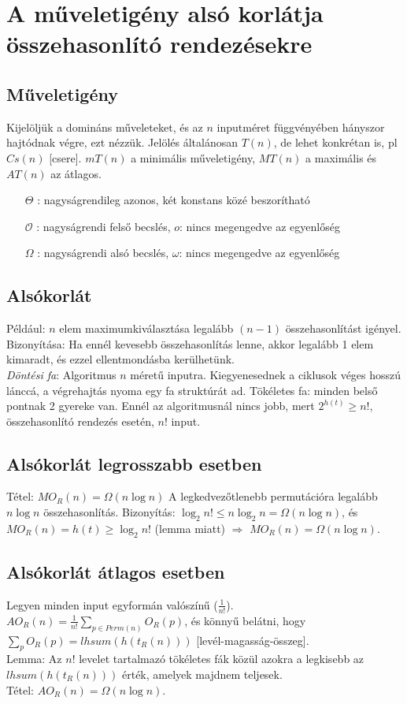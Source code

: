 \documentclass[margin=0px]{article}
\begin{document}
	\section{A műveletigény alsó korlátja összehasonlító rendezésekre}
	
	\subsection{Műveletigény}
	
	Kijelöljük a domináns műveleteket, és az $n$ inputméret függvényében hányszor hajtódnak végre, ezt nézzük. Jelölés általánosan $T(n)$, de lehet konkrétan is, pl $Cs(n)$ [csere]. $mT(n)$ a minimális műveletigény, $MT(n)$ a maximális és $AT(n)$ az átlagos.	
	\begin{itemize}
		\item[$\Theta$]: nagyságrendileg azonos, két konstans közé beszorítható
		\item[$\mathcal{O}$]: nagyságrendi felső becslés, $o$: nincs megengedve az egyenlőség
		\item[$\Omega$]: nagyságrendi alsó becslés, $\omega$: nincs megengedve az egyenlőség
	\end{itemize}
	
	\subsection{Alsókorlát}
	
	Például: $n$ elem maximumkiválasztása legalább $(n-1)$ összehasonlítást igényel. Bizonyítása: Ha ennél kevesebb összehasonlítás lenne, akkor legalább 1 elem kimaradt, és ezzel ellentmondásba kerülhetünk. \\
	\textit{Döntési fa}: Algoritmus $n$ méretű inputra. Kiegyenesednek a ciklusok véges hosszú lánccá, a végrehajtás nyoma egy fa struktúrát ad. Tökéletes fa: minden belső pontnak 2 gyereke van. Ennél az algoritmusnál nincs jobb, mert $2^{h(t)} \geq n!$, összehasonlító rendezés esetén, $n!$ input.
	
	\subsection{Alsókorlát legrosszabb esetben}
	
	Tétel: $MO_R(n) = \Omega(n\log{n})$ A legkedvezőtlenebb permutációra legalább $n\log{n}$ összehasonlítás. Bizonyítás: $\log_2{n!} \leq n\log_2{n} = \Omega(n\log{n})$, és $MO_R(n)=h(t) \geq \log_2{n!}$ (lemma miatt) $\Rightarrow$ $MO_R(n)=\Omega(n\log{n})$.
	
	\subsection{Alsókorlát átlagos esetben}
	
	Legyen minden input egyformán valószínű ($\frac{1}{n!}$). \\
	$AO_R(n) = \frac{1}{n!}\sum_{p \in Perm(n)}{O_R(p)}$, és könnyű belátni, hogy $\sum_{p}{O_R(p)} = lhsum(h(t_R(n)))$ [levél-magasság-összeg]. \\
	Lemma: Az $n!$ levelet tartalmazó tökéletes fák közül azokra a legkisebb az $lhsum(h(t_R(n)))$ érték, amelyek majdnem teljesek. \\
	Tétel: $AO_R(n) = \Omega(n\log{n})$.
	
\end{document}
